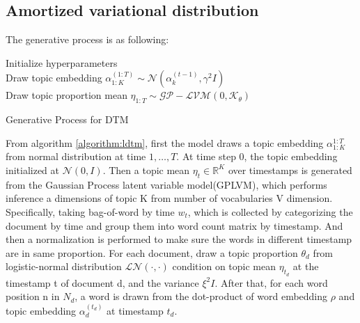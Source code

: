 \subsection{Amortized variational distribution}
The generative process is as following:\\
\begin{algorithm}[H]
Initialize hyperparameters\\
Draw topic embedding $ \alpha_{1:K}^{(1:T)}\sim\mathcal{N}(\alpha_k^{(t-1)},\gamma^2I) $\\
Draw topic proportion mean $ \eta_{1:T}\sim\mathcal{GP}-\mathcal{LVM}(0,\mathcal{K_\theta}) $\\
\caption{Generative Process for DTM}
\label{algorithm:ldtm}
\end{algorithm}
From algorithm \ref{algorithm:ldtm}, first the model draws a topic embedding $ \alpha_{1:K}^{1:T} $ from normal distribution at time $ 1,\dots,T $. At time step 0, the topic embedding initialized at $ \mathcal{N}(0,I) $.
Then a topic mean $ \eta_t\in\mathbb{R}^{K} $ over timestamps is generated from the Gaussian Process latent variable model(GPLVM), which performs inference a dimensions of topic K from number of vocabularies V dimension. Specifically, taking bag-of-word by time $ w_t $, which is collected by categorizing the document by time and group them into word count matrix by timestamp. And then a normalization is performed to make sure the words in different timestamp are in same proportion.
For each document, draw a topic proportion $ \theta_{d} $ from logistic-normal distribution $ \mathcal{LN}(\cdot,\cdot) $ condition on topic mean $ \eta_{t_d} $ at the timestamp t of document d, and the variance $ \xi^2I $.
After that, for each word position n in $ N_d $, a word is drawn from the dot-product of word embedding $ \rho $ and topic embedding $ \alpha^{(t_d)}_{d} $ at timestamp $ t_d $. 
